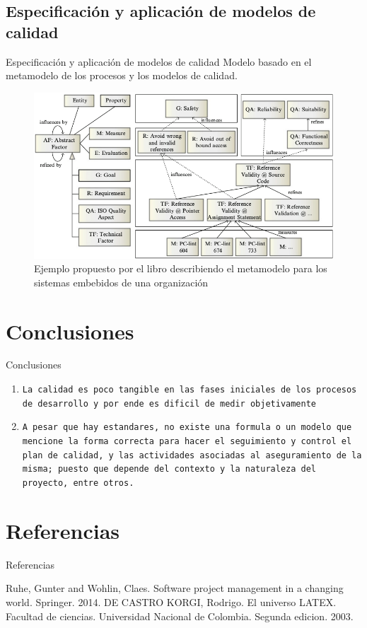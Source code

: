 \documentclass[10pt]{beamer}
\begin{document}
\subsection{Especificaci\'on y aplicaci\'on de modelos de calidad}
\begin{frame}{Especificaci\'on y aplicaci\'on de modelos de calidad}
Modelo basado en el metamodelo de los procesos y los modelos de calidad.

\begin{figure}
\centering
\includegraphics[width=0.7\linewidth]{./AAUgraphics/model_based_quality}
\caption{Ejemplo propuesto por el libro describiendo el metamodelo para los sistemas embebidos de una organizaci\'on}
\label{fig:model_based_quality}
\end{figure}

\end{frame}
\section{Conclusiones}
 \begin{frame}{Conclusiones}{}
 \justifying
 \begin{block}{}
  \begin{enumerate}
   \item {\tt La calidad es poco tangible en las fases iniciales de los procesos de desarrollo y por ende es dificil de medir objetivamente}
   \item {\tt A pesar que hay estandares, no existe una formula o un modelo que mencione la forma correcta para hacer el seguimiento y control el plan de calidad, y las actividades asociadas al aseguramiento de la misma; puesto que depende del contexto y la naturaleza del proyecto, entre otros.}
  \end{enumerate}
 \end{block}
 \end{frame}

\section{Referencias}
\begin{frame}{Referencias}
 \begin{thebibliography}{1}
   Ruhe, Gunter and Wohlin, Claes. Software project management in a changing world. Springer. 2014.  
   DE CASTRO KORGI, Rodrigo. El universo LATEX. Facultad de ciencias. Universidad Nacional de Colombia. Segunda edicion. 2003.  
 \end{thebibliography} 
\end{frame}

{\aauwavesbg
\begin{frame}
\end{frame}}
\end{document}
